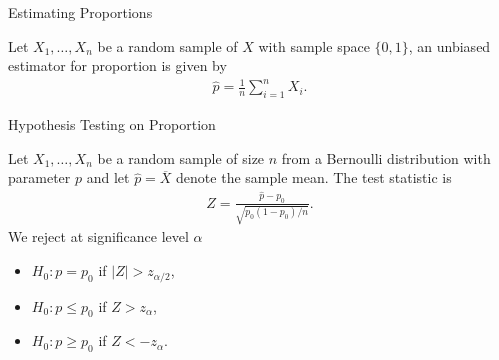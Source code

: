 \begin{frame}{Estimating Proportions}

\justifying
{} Let $X_1, \ldots, X_n$ be a random sample of $X$ with sample space $\{0, 1\}$, an unbiased estimator for proportion is given by
\begin{align*}
\widehat{p} = \frac{1}{n}\sum_{i=1}^n X_i.
\end{align*}

\end{frame}

\begin{frame}{Hypothesis Testing on Proportion}

\justifying
{} Let $X_1, \ldots, X_n$ be a random sample of size $n$ from a Bernoulli distribution with parameter $p$ and let $\widehat{p} = \overline{X}$ denote the sample mean. The test statistic is 
\begin{align*}
Z = \frac{\widehat{p} - p_0}{\sqrt{p_0(1-p_0)/n}}.
\end{align*}
We reject at significance level $\alpha$
\begin{itemize}
	\item $H_0: p = p_0$ if $|Z| > z_{\alpha/2}$,
	\item $H_0: p\leq p_0$ if $Z > z_{\alpha}$,
	\item $H_0: p\geq p_0$ if $Z < -z_{\alpha}$.
\end{itemize}

\end{frame}

